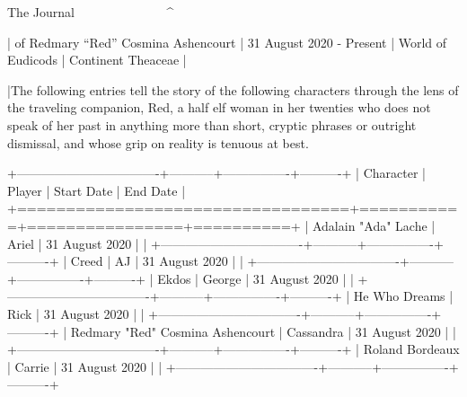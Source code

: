 The Journal
^^^^^^^^^^^^^^^^^^^^^^^^^^^^^^^^^^^^^^^^^^^^^^^^^^^^^^^^^^^^^^^^^^^^^^^^^^^^

| of Redmary “Red” Cosmina Ashencourt
| 31 August 2020 - Present
| World of Eudicods
| Continent Theaceae
|

|The following entries tell the story of the following characters through the lens of the traveling companion, Red, a half elf woman in her twenties who does not speak of her past in anything more than short, cryptic phrases or outright dismissal, and whose grip on reality is tenuous at best.

+----------------------------------+-----------+----------------+----------+
| Character                        | Player    | Start Date     | End Date |
+==================================+===========+================+==========+
| Adalain "Ada" Lache              | Ariel     | 31 August 2020 |          |
+----------------------------------+-----------+----------------+----------+
| Creed                            | AJ        | 31 August 2020 |          |
+----------------------------------+-----------+----------------+----------+
| Ekdos                            | George    | 31 August 2020 |          |
+----------------------------------+-----------+----------------+----------+
| He Who Dreams                    | Rick      | 31 August 2020 |          |
+----------------------------------+-----------+----------------+----------+
| Redmary "Red" Cosmina Ashencourt | Cassandra | 31 August 2020 |          |
+----------------------------------+-----------+----------------+----------+
| Roland Bordeaux                  | Carrie    | 31 August 2020 |          |
+----------------------------------+-----------+----------------+----------+
